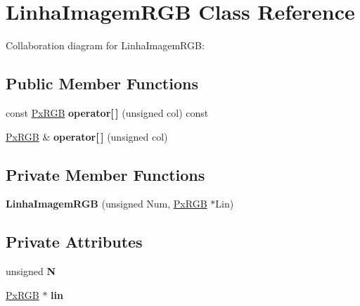 \hypertarget{classLinhaImagemRGB}{}\section{Linha\+Imagem\+R\+GB Class Reference}
\label{classLinhaImagemRGB}


Collaboration diagram for Linha\+Imagem\+R\+GB\+:
\subsection*{Public Member Functions}
\begin{DoxyCompactItemize}
\item 
const \hyperlink{classPxRGB}{Px\+R\+GB} {\bfseries operator\mbox{[}$\,$\mbox{]}} (unsigned col) const \hypertarget{classLinhaImagemRGB_a45a8c7c6370fb9c7daf65adcb97bc676}{}\label{classLinhaImagemRGB_a45a8c7c6370fb9c7daf65adcb97bc676}

\item 
\hyperlink{classPxRGB}{Px\+R\+GB} \& {\bfseries operator\mbox{[}$\,$\mbox{]}} (unsigned col)\hypertarget{classLinhaImagemRGB_af211b65c66ec38e0471c1cef31e579c3}{}\label{classLinhaImagemRGB_af211b65c66ec38e0471c1cef31e579c3}

\end{DoxyCompactItemize}
\subsection*{Private Member Functions}
\begin{DoxyCompactItemize}
\item 
{\bfseries Linha\+Imagem\+R\+GB} (unsigned Num, \hyperlink{classPxRGB}{Px\+R\+GB} $\ast$Lin)\hypertarget{classLinhaImagemRGB_aaa1d966e96ffc73c51f5770f8e86a234}{}\label{classLinhaImagemRGB_aaa1d966e96ffc73c51f5770f8e86a234}

\end{DoxyCompactItemize}
\subsection*{Private Attributes}
\begin{DoxyCompactItemize}
\item 
unsigned {\bfseries N}\hypertarget{classLinhaImagemRGB_abd9de9cade6f7b9224128c821932228e}{}\label{classLinhaImagemRGB_abd9de9cade6f7b9224128c821932228e}

\item 
\hyperlink{classPxRGB}{Px\+R\+GB} $\ast$ {\bfseries lin}\hypertarget{classLinhaImagemRGB_a84b93219ed42fdeb2674396604150ab6}{}\label{classLinhaImagemRGB_a84b93219ed42fdeb2674396604150ab6}

\end{DoxyCompactItemize}
